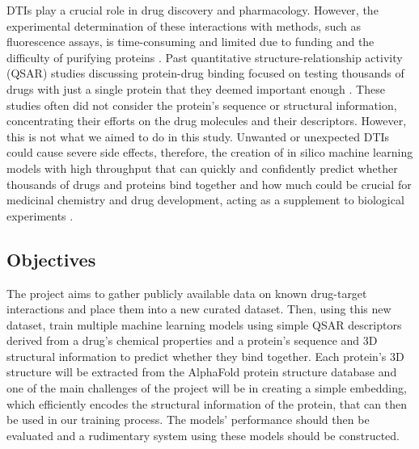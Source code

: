 DTIs play a crucial role in drug discovery and pharmacology. However, the experimental determination of these interactions with methods, such as fluorescence assays, is time-consuming and limited due to funding and the difficulty of purifying proteins \citep{Shar2016, Wang2020}. Past quantitative structure-relationship activity (QSAR) studies discussing protein-drug binding focused on testing thousands of drugs with just a single protein that they deemed important enough \citep{Colmenarejo2003, Vallianatou2013}. These studies often did not consider the protein's sequence or structural information, concentrating their efforts on the drug molecules and their descriptors. However, this is not what we aimed to do in this study. Unwanted or unexpected DTIs could cause severe side effects, therefore, the creation of in silico machine learning models with high throughput that can quickly and confidently predict whether thousands of drugs and proteins bind together and how much could be crucial for medicinal chemistry and drug development, acting as a supplement to biological experiments \citep{Shar2016, Wang2020}.

\subsection{Objectives}
\label{subsec:Objectives}

The project aims to gather publicly available data on known drug-target interactions and place them into a new curated dataset. Then, using this new dataset, train multiple machine learning models using simple QSAR descriptors derived from a drug's chemical properties and a protein's sequence and 3D structural information to predict whether they bind together. Each protein's 3D structure will be extracted from the AlphaFold protein structure database \citep{Jumper2021, Varadi2022} and one of the main challenges of the project will be in creating a simple embedding, which efficiently encodes the structural information of the protein, that can then be used in our training process. The models' performance should then be evaluated and a rudimentary system using these models should be constructed.
